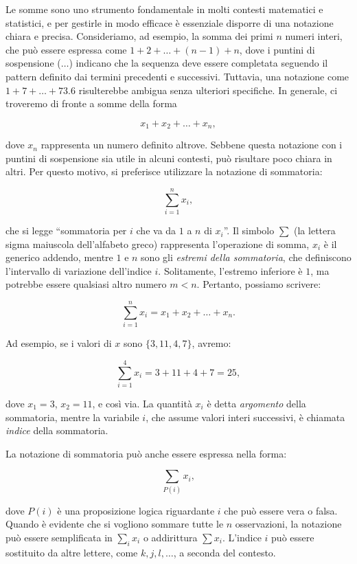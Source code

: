 \documentclass[
  italian,
  letterpaper,
  a4paper,
  11pt,
  open=any]{scrbook}
\theoremstyle{plain}
\theoremstyle{definition}
\theoremstyle{definition}
\theoremstyle{remark}
\begin{document}
Le somme sono uno strumento fondamentale in molti contesti matematici e
statistici, e per gestirle in modo efficace è essenziale disporre di una
notazione chiara e precisa. Consideriamo, ad esempio, la somma dei primi
\(n\) numeri interi, che può essere espressa come
\(1 + 2 + \dots + (n-1) + n\), dove i puntini di sospensione (\(\dots\))
indicano che la sequenza deve essere completata seguendo il pattern
definito dai termini precedenti e successivi. Tuttavia, una notazione
come \(1 + 7 + \dots + 73.6\) risulterebbe ambigua senza ulteriori
specifiche. In generale, ci troveremo di fronte a somme della forma

\[
x_1 + x_2 + \dots + x_n,
\]

dove \(x_n\) rappresenta un numero definito altrove. Sebbene questa
notazione con i puntini di sospensione sia utile in alcuni contesti, può
risultare poco chiara in altri. Per questo motivo, si preferisce
utilizzare la notazione di sommatoria:

\[
\sum_{i=1}^n x_i,
\]

che si legge ``sommatoria per \(i\) che va da \(1\) a \(n\) di
\(x_i\)''. Il simbolo \(\sum\) (la lettera sigma maiuscola dell'alfabeto
greco) rappresenta l'operazione di somma, \(x_i\) è il generico addendo,
mentre \(1\) e \(n\) sono gli \emph{estremi della sommatoria}, che
definiscono l'intervallo di variazione dell'indice \(i\). Solitamente,
l'estremo inferiore è \(1\), ma potrebbe essere qualsiasi altro numero
\(m < n\). Pertanto, possiamo scrivere:

\[
\sum_{i=1}^n x_i = x_1 + x_2 + \dots + x_n.
\]

Ad esempio, se i valori di \(x\) sono \(\{3, 11, 4, 7\}\), avremo:

\[
\sum_{i=1}^4 x_i = 3 + 11 + 4 + 7 = 25,
\]

dove \(x_1 = 3\), \(x_2 = 11\), e così via. La quantità \(x_i\) è detta
\emph{argomento} della sommatoria, mentre la variabile \(i\), che assume
valori interi successivi, è chiamata \emph{indice} della sommatoria.

La notazione di sommatoria può anche essere espressa nella forma:

\[
\sum_{P(i)} x_i,
\]

dove \(P(i)\) è una proposizione logica riguardante \(i\) che può essere
vera o falsa. Quando è evidente che si vogliono sommare tutte le \(n\)
osservazioni, la notazione può essere semplificata in \(\sum_{i} x_i\) o
addirittura \(\sum x_i\). L'indice \(i\) può essere sostituito da altre
lettere, come \(k, j, l, \dots\), a seconda del contesto.
\end{document}
